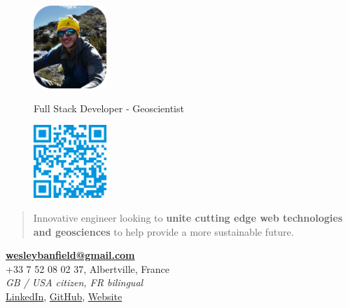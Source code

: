 \documentclass[]{friggeri-cv}
\begin{document}
\begin{figure}[!h]
	\begin{minipage}{0.48\textwidth}
		\begin{flushleft}
			\includegraphics[width=2.75cm]{img/profile_relaxed.png}
		\end{flushleft}
	\end{minipage}\hfill
 	{Full Stack Developer - Geoscientist}
	\begin{minipage}{0.48\textwidth}
		\begin{flushright}
			\includegraphics[width=2.75cm]{img/qrcode.png}
		\end{flushright}
	\end{minipage}
\end{figure}
\vspace{-0.75cm}

\begin{quote}
\large
\begin{center}
Innovative engineer looking to \textbf{unite cutting edge web technologies and geosciences} to help provide a more sustainable future.
\\
\end{center}
\end{quote}

\begin{center}
\vspace{6pt}
\href{mailto:wesleybanfield@gmail.com}{\textbf{wesleybanfield@gmail.com}}
\\+33 7 52 08 02 37, Albertville, France
\\\emph{GB / USA citizen, FR bilingual}
\vspace{3pt}
\\\href{https://www.linkedin.com/in/wesleybanfield/}{LinkedIn},
\href{https://github.com/WesleyTheGeolien}{GitHub},
\href{https://wesleythegeolien.github.io}{Website}
\end{center}
\end{document}
